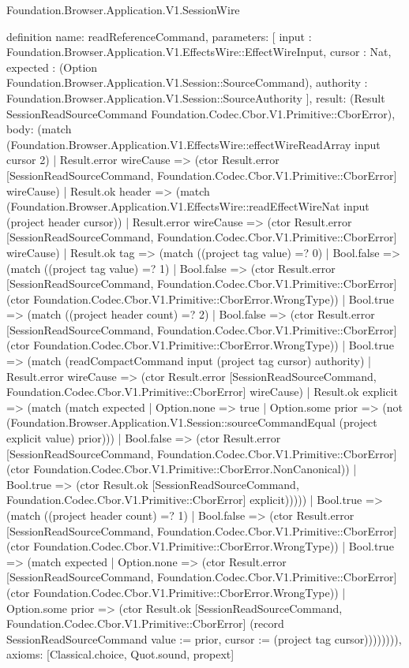 \begin{lexlean}{Foundation.Browser.Application.V1.SessionWire}
\begin{semanticmodule}
definition{
  name: readReferenceCommand,
  parameters: [
    input : Foundation.Browser.Application.V1.EffectsWire::EffectWireInput,
    cursor : Nat,
    expected : (Option Foundation.Browser.Application.V1.Session::SourceCommand),
    authority : Foundation.Browser.Application.V1.Session::SourceAuthority
  ],
  result: (Result SessionReadSourceCommand Foundation.Codec.Cbor.V1.Primitive::CborError),
  body: (match (Foundation.Browser.Application.V1.EffectsWire::effectWireReadArray input cursor 2)
    | Result.error wireCause => (ctor Result.error [SessionReadSourceCommand, Foundation.Codec.Cbor.V1.Primitive::CborError] wireCause)
    | Result.ok header => (match (Foundation.Browser.Application.V1.EffectsWire::readEffectWireNat input (project header cursor))
      | Result.error wireCause => (ctor Result.error [SessionReadSourceCommand, Foundation.Codec.Cbor.V1.Primitive::CborError] wireCause)
      | Result.ok tag => (match ((project tag value) =? 0)
        | Bool.false => (match ((project tag value) =? 1)
          | Bool.false => (ctor Result.error [SessionReadSourceCommand, Foundation.Codec.Cbor.V1.Primitive::CborError] (ctor Foundation.Codec.Cbor.V1.Primitive::CborError.WrongType))
          | Bool.true => (match ((project header count) =? 2)
            | Bool.false => (ctor Result.error [SessionReadSourceCommand, Foundation.Codec.Cbor.V1.Primitive::CborError] (ctor Foundation.Codec.Cbor.V1.Primitive::CborError.WrongType))
            | Bool.true => (match (readCompactCommand input (project tag cursor) authority)
              | Result.error wireCause => (ctor Result.error [SessionReadSourceCommand, Foundation.Codec.Cbor.V1.Primitive::CborError] wireCause)
              | Result.ok explicit => (match (match expected
                  | Option.none => true
                  | Option.some prior => (not (Foundation.Browser.Application.V1.Session::sourceCommandEqual (project explicit value) prior)))
                | Bool.false => (ctor Result.error [SessionReadSourceCommand, Foundation.Codec.Cbor.V1.Primitive::CborError] (ctor Foundation.Codec.Cbor.V1.Primitive::CborError.NonCanonical))
                | Bool.true => (ctor Result.ok [SessionReadSourceCommand, Foundation.Codec.Cbor.V1.Primitive::CborError] explicit)))))
        | Bool.true => (match ((project header count) =? 1)
          | Bool.false => (ctor Result.error [SessionReadSourceCommand, Foundation.Codec.Cbor.V1.Primitive::CborError] (ctor Foundation.Codec.Cbor.V1.Primitive::CborError.WrongType))
          | Bool.true => (match expected
            | Option.none => (ctor Result.error [SessionReadSourceCommand, Foundation.Codec.Cbor.V1.Primitive::CborError] (ctor Foundation.Codec.Cbor.V1.Primitive::CborError.WrongType))
            | Option.some prior => (ctor Result.ok [SessionReadSourceCommand, Foundation.Codec.Cbor.V1.Primitive::CborError] (record SessionReadSourceCommand {value := prior, cursor := (project tag cursor)}))))))),
  axioms: [Classical.choice, Quot.sound, propext]
}


\end{semanticmodule}
\end{lexlean}

